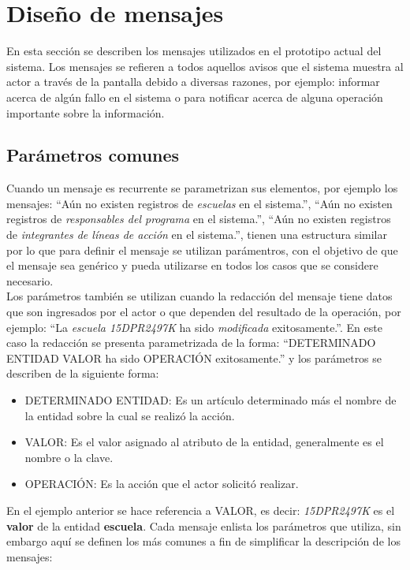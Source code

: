 \section{Diseño de mensajes}
	En esta sección se describen los mensajes utilizados en el prototipo actual del sistema. Los mensajes se refieren a todos
	aquellos avisos que el sistema muestra al actor a través de la pantalla debido a diversas
	razones, por ejemplo: informar acerca de algún fallo en el sistema o para notificar acerca de alguna operación importante sobre la información.

\subsection{Parámetros comunes}
    Cuando un mensaje es recurrente se parametrizan sus elementos, por ejemplo los mensajes: ``Aún no existen registros de {\em escuelas} en el sistema.'', ``Aún no existen registros de {\em responsables del programa} en el sistema.'', 
    ``Aún no existen registros de {\em integrantes de líneas de acción} en el sistema.'', tienen una estructura similar 
    por lo que para definir el mensaje se utilizan parámentros, con el objetivo de que el mensaje sea genérico y  
    pueda utilizarse en todos los casos que se considere necesario.\\
    
    Los parámetros también se utilizan cuando la redacción del mensaje tiene datos que son ingresados por el actor o que dependen del resultado de la operación, por ejemplo: 
    ``La {\em escuela  15DPR2497K} ha sido {\em modificada} exitosamente.''. En este caso la redacción se presenta parametrizada de la forma: ``DETERMINADO ENTIDAD VALOR ha sido OPERACIÓN exitosamente.'' y los 
    parámetros se describen de la siguiente forma:
    
    \begin{itemize}
	\item DETERMINADO ENTIDAD: Es un artículo determinado más el nombre de la entidad sobre la cual se realizó la acción.
	\item VALOR: Es el valor asignado al atributo de la entidad, generalmente es el nombre o la clave.
	\item OPERACIÓN: Es la acción que el actor solicitó realizar.
    \end{itemize}

    En el ejemplo anterior se hace referencia a VALOR, es decir: {\em 15DPR2497K} es el {\bf valor}  de la entidad {\bf escuela}. Cada mensaje enlista los parámetros 
    que utiliza, sin embargo aquí se definen los más comunes a fin de simplificar la descripción de los mensajes:


